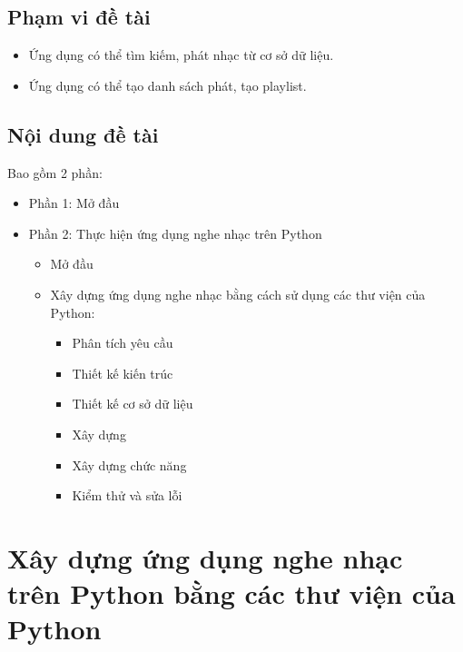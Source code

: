 \documentclass[a4paper]{article}
\begin{document}
\subsection{Phạm vi đề tài}
\begin{itemize}
	\item Ứng dụng có thể tìm kiếm, phát nhạc từ cơ sở dữ liệu.
	\item Ứng dụng có thể tạo danh sách phát, tạo playlist.
\end{itemize}
\subsection{Nội dung đề tài}
\begin{flushleft}
	Bao gồm 2 phần:
	\begin{itemize}
		\item Phần 1: Mở đầu
		\item Phần 2: Thực hiện ứng dụng nghe nhạc trên Python
		      \begin{itemize}
			      \item Mở đầu
			      \item Xây dựng ứng dụng nghe nhạc bằng cách sử dụng các thư viện của Python:
			            \begin{itemize}
				            \item Phân tích yêu cầu
				            \item Thiết kế kiến trúc
				            \item Thiết kế cơ sở dữ liệu
				            \item Xây dựng
				            \item Xây dựng chức năng
				            \item Kiểm thử và sửa lỗi
			            \end{itemize}
		      \end{itemize}
	\end{itemize}
\end{flushleft}

\section{Xây dựng ứng dụng nghe nhạc trên Python bằng các thư viện của Python}
\end{document}
